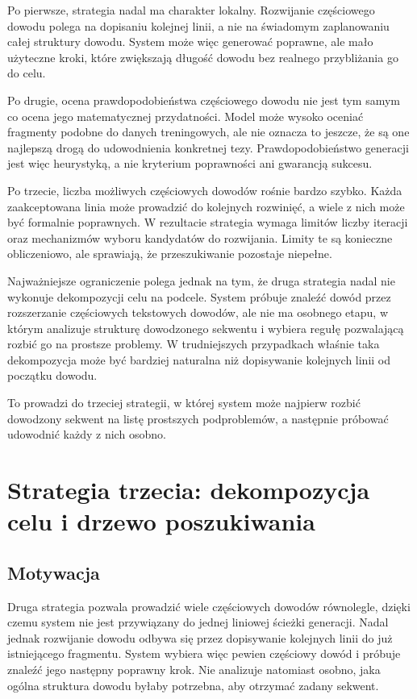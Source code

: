 \documentclass[shortabstract]{iithesis}
\theoremstyle{definition}
\theoremstyle{remark}
\theoremstyle{plain}
\begin{document}
Po pierwsze, strategia nadal ma charakter lokalny. Rozwijanie częściowego dowodu
polega na dopisaniu kolejnej linii, a nie na świadomym zaplanowaniu całej struktury
dowodu. System może więc generować poprawne, ale mało użyteczne kroki, które
zwiększają długość dowodu bez realnego przybliżania go do celu.

Po drugie, ocena prawdopodobieństwa częściowego dowodu nie jest tym samym co
ocena jego matematycznej przydatności. Model może wysoko oceniać fragmenty
podobne do danych treningowych, ale nie oznacza to jeszcze, że są one najlepszą
drogą do udowodnienia konkretnej tezy. Prawdopodobieństwo generacji jest więc
heurystyką, a nie kryterium poprawności ani gwarancją sukcesu.

Po trzecie, liczba możliwych częściowych dowodów rośnie bardzo szybko. Każda
zaakceptowana linia może prowadzić do kolejnych rozwinięć, a wiele z nich może być
formalnie poprawnych. W rezultacie strategia wymaga limitów liczby iteracji oraz
mechanizmów wyboru kandydatów do rozwijania. Limity te są konieczne obliczeniowo,
ale sprawiają, że przeszukiwanie pozostaje niepełne.

Najważniejsze ograniczenie polega jednak na tym, że druga strategia nadal nie
wykonuje dekompozycji celu na podcele. System próbuje znaleźć dowód przez
rozszerzanie częściowych tekstowych dowodów, ale nie ma osobnego etapu, w którym
analizuje strukturę dowodzonego sekwentu i wybiera regułę pozwalającą rozbić go
na prostsze problemy. W trudniejszych przypadkach właśnie taka dekompozycja może
być bardziej naturalna niż dopisywanie kolejnych linii od początku dowodu.

To prowadzi do trzeciej strategii, w której system może najpierw rozbić dowodzony
sekwent na listę prostszych podproblemów, a następnie próbować udowodnić każdy
z nich osobno.





\section{Strategia trzecia: dekompozycja celu i drzewo poszukiwania}


\subsection{Motywacja}

Druga strategia pozwala prowadzić wiele częściowych dowodów równolegle, dzięki
czemu system nie jest przywiązany do jednej liniowej ścieżki generacji. Nadal jednak
rozwijanie dowodu odbywa się przez dopisywanie kolejnych linii do już istniejącego
fragmentu. System wybiera więc pewien częściowy dowód i próbuje znaleźć jego
następny poprawny krok. Nie analizuje natomiast osobno, jaka ogólna struktura
dowodu byłaby potrzebna, aby otrzymać zadany sekwent.
\end{document}
